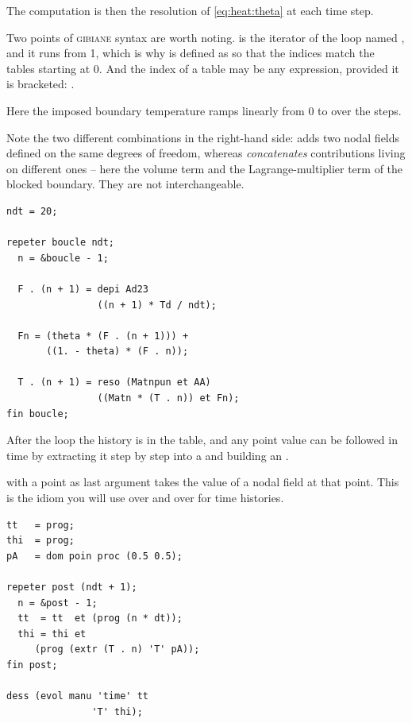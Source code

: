 \begin{castemcom}
The computation is then the resolution of \eqref{eq:heat:theta} at each time
step.

Two points of \textsc{gibiane} syntax are worth noting.  is the
iterator of the loop named , and it runs from 1, which is why
%
 is defined as  so that the indices match the tables
starting at 0. And the index of a table may be any expression, provided it is
bracketed: .

Here the imposed boundary temperature ramps linearly from 0 to  over
the  steps.

Note the two different combinations in the right-hand side: \op{+} adds two
nodal fields defined on the same degrees of freedom, whereas 
\emph{concatenates} contributions living on different ones -- here the
volume term and the Lagrange-multiplier term of the blocked boundary. They
are not interchangeable.
\end{castemcom}
\begin{castemlines}
\begin{verbatim}
ndt = 20;

repeter boucle ndt;
  n = &boucle - 1;

  F . (n + 1) = depi Ad23
                ((n + 1) * Td / ndt);

  Fn = (theta * (F . (n + 1))) +
       ((1. - theta) * (F . n));

  T . (n + 1) = reso (Matnpun et AA)
                ((Matn * (T . n)) et Fn);
fin boucle;
\end{verbatim}
\end{castemlines}

\begin{castemcom}
After the loop the history is in the table, and any point value can be
followed in time by extracting it step by step into a  and
building an .

 with a point as last argument takes the value of a nodal field at
that point. This is the idiom you will use over and over for time histories.
\end{castemcom}
\begin{castemlines}
\begin{verbatim}
tt   = prog;
thi  = prog;
pA   = dom poin proc (0.5 0.5);

repeter post (ndt + 1);
  n = &post - 1;
  tt  = tt  et (prog (n * dt));
  thi = thi et
     (prog (extr (T . n) 'T' pA));
fin post;

dess (evol manu 'time' tt
               'T' thi);
\end{verbatim}
\end{castemlines}

